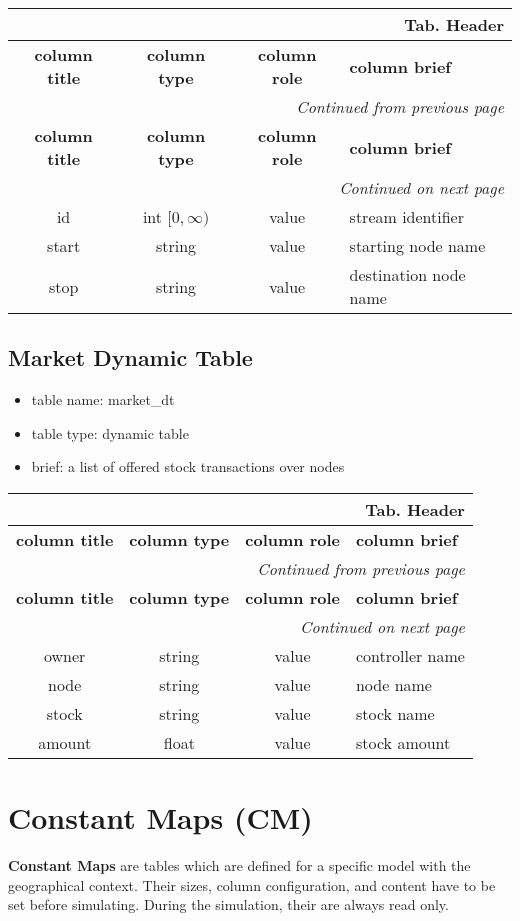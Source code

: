 \documentclass[a4paper,oneside,titlepage]{report}
\newcommand*{\LTHeaderIV}[5]{
  \multicolumn{4}{r}{\textbf{Tab. \thesubsection} \textbf{#1}}\\    
  \hline
  \textbf{#2} & \textbf{#3} & \textbf{#4} & \textbf{#5}\\
  \hline
  
  \endfirsthead
  \multicolumn{4}{r}{\textit{Continued from previous page}}\\    
  \hline
  \textbf{#2} & \textbf{#3} & \textbf{#4} & \textbf{#5}\\
  \hline
  \endhead
  \hline
  \multicolumn{4}{r}{\textit{Continued on next page}}\\
  \endfoot
  \hline
  \endlastfoot  
}
\begin{document}
\vspace{-0.5cm}
\begin{longtable}{ |c|c|c|l| } 
  \LTHeaderIV{Header}{column title}{column type}{column role}{column brief}                    
  id & int $[0, \infty)$ & value & stream identifier\\
  start & string & value & starting node name\\
  stop & string & value & destination node name\\
\end{longtable}        


\subsection{Market Dynamic Table}
\begin{itemize}
  \setlength{\itemsep}{0pt}
  \setlength{\parskip}{0pt}
\item table name: market\_dt  
\item table type: dynamic table   
\item brief: a list of offered stock transactions over nodes
\end{itemize}

\begin{longtable}{ |c|c|c|l| } 
  \LTHeaderIV{Header}{column title}{column type}{column role}{column brief}                    
  owner & string & value & controller name\\
  node & string & value & node name\\
  stock & string & value & stock name\\
  amount & float & value & stock amount\\
\end{longtable}        

\section{Constant Maps (CM)}
\textbf{Constant Maps} are tables which are defined for a specific model with the geographical context. Their sizes, column configuration, and content have to be set before simulating. During the simulation, their are always read only.

\end{document}
